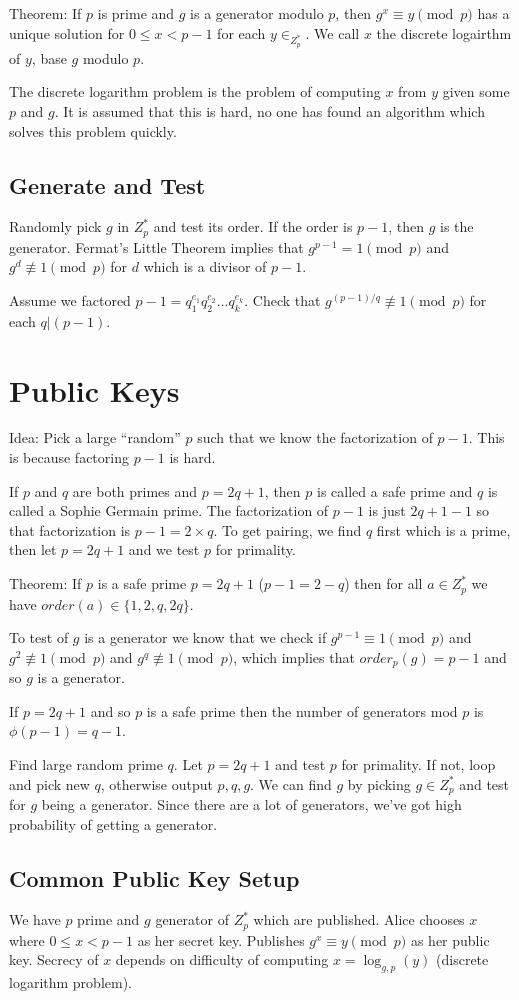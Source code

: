 \documentclass[psamsfonts]{amsart}
\begin{document}
Theorem: If $p$ is prime and $g$ is a generator modulo $p$, then $g^{x} \equiv y \pmod{p}$ has a unique solution for $0 \leq x < p -1$ for each $y \in _Z_p^*$. We call $x$ the discrete logairthm of $y$, base $g$ modulo $p$.

The discrete logarithm problem is the problem of computing $x$ from $y$ given some $p$ and $g$. It is assumed that this is hard, no one has found an algorithm which solves this problem quickly.

\subsection{Generate and Test}

Randomly pick $g$ in $Z_{p}^*$ and test its order. If the order is $p-1$, then $g$ is the generator. Fermat's Little Theorem implies that $g^{p-1} = 1 \pmod{p}$ and $g^{d} \not \equiv 1 \pmod{p}$ for $d$ which is a divisor of $p-1$.

Assume we factored $p-1 = q_1^{e_1} q_2^{e_2} \ldots q_k^{e_k}$. Check that $g^{(p-1)/q} \not \equiv 1 \pmod{p}$ for each $q | (p-1)$.

\section{Public Keys}

Idea: Pick a large ``random'' $p$ such that we know the factorization of $p-1$. This is because factoring $p-1$ is hard.

If $p$ and $q$ are both primes and $p = 2q+1$, then $p$ is called a safe prime and $q$ is called a Sophie Germain prime. The factorization of $p-1$ is just $2q+1-1$ so that factorization is $p-1 = 2 \times q$. To get pairing, we find $q$ first which is a prime, then let $p = 2q + 1$ and we test $p$ for primality.

Theorem: If $p$ is a safe prime $p = 2q+1$ ($p-1 = 2-q$) then for all $a \in Z_p^*$ we have $order(a) \in \{1, 2, q, 2q\}$.

To test of $g$ is a generator we know that we check if $g^{p-1} \equiv 1 \pmod{p}$ and $g^2 \not \equiv 1 \pmod{p}$ and $g^q \not \equiv 1 \pmod{p}$, which implies that $order_p(g) = p-1$ and so $g$ is a generator.

If $p = 2q + 1$ and so $p$ is a safe prime then the number of generators mod $p$ is $\phi(p-1) = q-1$.

Find large random prime $q$. Let $p = 2q + 1$ and test $p$ for primality. If not, loop and pick new $q$, otherwise output $p,q,g$. We can find $g$ by picking $g \in Z_{p}^*$ and test for $g$ being a generator. Since there are a lot of generators, we've got high probability of getting a generator.

\subsection{Common Public Key Setup}

We have $p$ prime and $g$ generator of $Z_{p}^*$ which are published. Alice chooses $x$ where $0 \leq x < p-1$ as her secret key. Publishes $g^{x} \equiv y \pmod{p}$ as her public key. Secrecy of $x$ depends on difficulty of computing $x = \log_{g,p} (y)$ (discrete logarithm problem).
\end{document}
